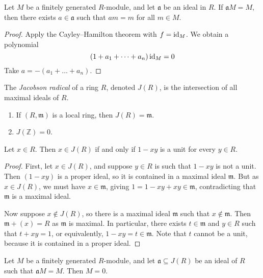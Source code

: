 \begin{corollary}
    Let \( M \) be a finitely generated \( R \)-module, and let \( \mathfrak a \) be an ideal in \( R \).
    If \( \mathfrak a M = M \), then there exists \( a \in \mathfrak a \) such that \( am = m \) for all \( m \in M \).
\end{corollary}
\begin{proof}
    Apply the Cayley--Hamilton theorem with \( f = \operatorname{id}_M \).
    We obtain a polynomial
    \[ (1 + a_1 + \dots + a_n) \operatorname{id}_M = 0 \]
    Take \( a = -(a_1 + \dots + a_n) \).
\end{proof}
\begin{definition}
    The \emph{Jacobson radical} of a ring \( R \), denoted \( J(R) \), is the intersection of all maximal ideals of \( R \).
\end{definition}
\begin{example}
    \begin{enumerate}
        \item If \( (R, \mathfrak m) \) is a local ring, then \( J(R) = \mathfrak m \).
        \item \( J(\mathbb Z) = \qty{0} \).
    \end{enumerate}
\end{example}
\begin{proposition}
    Let \( x \in R \).
    Then \( x \in J(R) \) if and only if \( 1 - xy \) is a unit for every \( y \in R \).
\end{proposition}
\begin{proof}
    First, let \( x \in J(R) \), and suppose \( y \in R \) is such that \( 1 - xy \) is not a unit.
    Then \( (1 - xy) \) is a proper ideal, so it is contained in a maximal ideal \( \mathfrak m \).
    But as \( x \in J(R) \), we must have \( x \in \mathfrak m \), giving \( 1 = 1 - xy + xy \in \mathfrak m \), contradicting that \( \mathfrak m \) is a maximal ideal.

    Now suppose \( x \notin J(R) \), so there is a maximal ideal \( \mathfrak m \) such that \( x \notin \mathfrak m \).
    Then \( \mathfrak m + (x) = R \) as \( \mathfrak m \) is maximal.
    In particular, there exists \( t \in \mathfrak m \) and \( y \in R \) such that \( t + xy = 1 \), or equivalently, \( 1 - xy = t \in \mathfrak m \).
    Note that \( t \) cannot be a unit, because it is contained in a proper ideal.
\end{proof}
\begin{proposition}
    Let \( M \) be a finitely generated \( R \)-module, and let \( \mathfrak a \subseteq J(R) \) be an ideal of \( R \) such that \( \mathfrak a M = M \).
    Then \( M = 0 \).
\end{proposition}
